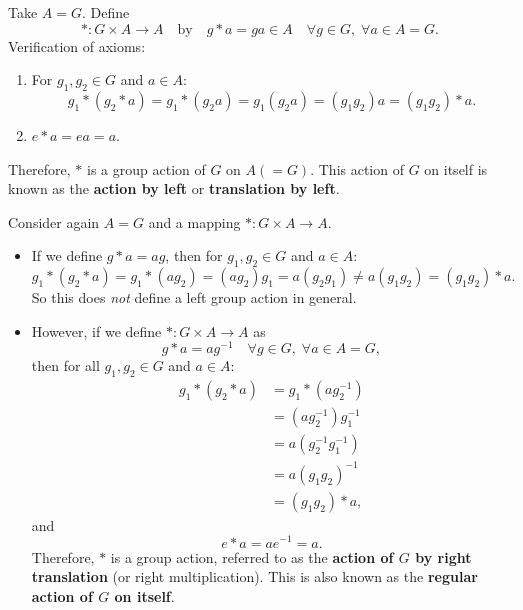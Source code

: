 \begin{example}
Take $A = G$. Define
\[
* : G \times A \longrightarrow A \quad \text{by} \quad g * a = ga \in A \quad \forall g \in G, \; \forall a \in A = G.
\]
Verification of axioms:
\begin{enumerate}[label=(\roman*)]
    \item For $g_1, g_2 \in G$ and $a \in A$:
    \[
    g_1 * (g_2 * a) = g_1 * (g_2 a) = g_1(g_2 a) = (g_1 g_2)a = (g_1 g_2) * a.
    \]
    \item $e * a = ea = a$.
\end{enumerate}
Therefore, $*$ is a group action of $G$ on $A (= G)$. This action of $G$ on itself is known as the \textbf{action by left} or \textbf{translation by left}.
\end{example}

\begin{example}
Consider again $A = G$ and a mapping $* : G \times A \to A$.
\begin{itemize}
    \item If we define $g * a = ag$, then for $g_1, g_2 \in G$ and $a \in A$:
    \[
    g_1 * (g_2 * a) = g_1 * (ag_2) = (ag_2)g_1 = a(g_2 g_1) \neq a(g_1 g_2) = (g_1 g_2) * a.
    \]
    So this does \emph{not} define a left group action in general.
    \item However, if we define $* : G \times A \to A$ as
    \[
    g * a = ag^{-1} \quad \forall g \in G, \; \forall a \in A = G,
    \]
    then for all $g_1, g_2 \in G$ and $a \in A$:
    \begin{align*}
    g_1 * (g_2 * a) &= g_1 * (ag_2^{-1}) \\
    &= (ag_2^{-1})g_1^{-1} \\
    &= a(g_2^{-1} g_1^{-1}) \\
    &= a(g_1 g_2)^{-1} \\
    &= (g_1 g_2) * a,
    \end{align*}
    and
    \[
    e * a = ae^{-1} = a.
    \]
    Therefore, $*$ is a group action, referred to as the \textbf{action of $G$ by right translation} (or right multiplication). This is also known as the \textbf{regular action of $G$ on itself}.
\end{itemize}
\end{example}
